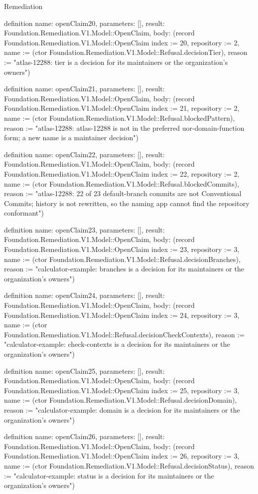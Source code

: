 \begin{lexlean}{Remediation}
\begin{semanticmodule}
definition{
  name: openClaim20,
  parameters: [],
  result: Foundation.Remediation.V1.Model::OpenClaim,
  body: (record Foundation.Remediation.V1.Model::OpenClaim {index := 20, repository := 2, name := (ctor Foundation.Remediation.V1.Model::Refusal.decisionTier), reason := "atlas-12288: tier is a decision for its maintainers or the organization's owners"})
}

definition{
  name: openClaim21,
  parameters: [],
  result: Foundation.Remediation.V1.Model::OpenClaim,
  body: (record Foundation.Remediation.V1.Model::OpenClaim {index := 21, repository := 2, name := (ctor Foundation.Remediation.V1.Model::Refusal.blockedPattern), reason := "atlas-12288: atlas-12288 is not in the preferred uor-{domain}-{function} form; a new name is a maintainer decision"})
}

definition{
  name: openClaim22,
  parameters: [],
  result: Foundation.Remediation.V1.Model::OpenClaim,
  body: (record Foundation.Remediation.V1.Model::OpenClaim {index := 22, repository := 2, name := (ctor Foundation.Remediation.V1.Model::Refusal.blockedCommits), reason := "atlas-12288: 22 of 23 default-branch commits are not Conventional Commits; history is not rewritten, so the naming app cannot find the repository conformant"})
}

definition{
  name: openClaim23,
  parameters: [],
  result: Foundation.Remediation.V1.Model::OpenClaim,
  body: (record Foundation.Remediation.V1.Model::OpenClaim {index := 23, repository := 3, name := (ctor Foundation.Remediation.V1.Model::Refusal.decisionBranches), reason := "calculator-example: branches is a decision for its maintainers or the organization's owners"})
}

definition{
  name: openClaim24,
  parameters: [],
  result: Foundation.Remediation.V1.Model::OpenClaim,
  body: (record Foundation.Remediation.V1.Model::OpenClaim {index := 24, repository := 3, name := (ctor Foundation.Remediation.V1.Model::Refusal.decisionCheckContexts), reason := "calculator-example: check-contexts is a decision for its maintainers or the organization's owners"})
}

definition{
  name: openClaim25,
  parameters: [],
  result: Foundation.Remediation.V1.Model::OpenClaim,
  body: (record Foundation.Remediation.V1.Model::OpenClaim {index := 25, repository := 3, name := (ctor Foundation.Remediation.V1.Model::Refusal.decisionDomain), reason := "calculator-example: domain is a decision for its maintainers or the organization's owners"})
}

definition{
  name: openClaim26,
  parameters: [],
  result: Foundation.Remediation.V1.Model::OpenClaim,
  body: (record Foundation.Remediation.V1.Model::OpenClaim {index := 26, repository := 3, name := (ctor Foundation.Remediation.V1.Model::Refusal.decisionStatus), reason := "calculator-example: status is a decision for its maintainers or the organization's owners"})
}


\end{semanticmodule}
\end{lexlean}
